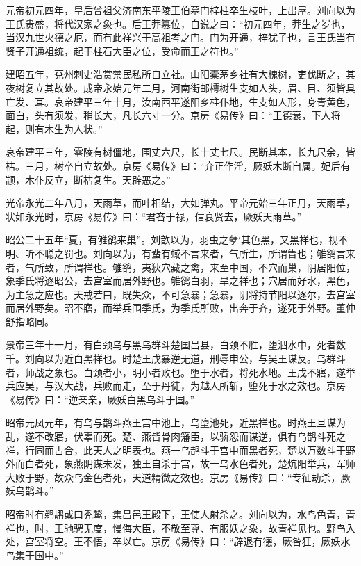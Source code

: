 \documentclass[12pt,UTF8]{ctexbook}
\begin{document}
元帝初元四年，皇后曾祖父济南东平陵王伯墓门梓柱卒生枝叶，上出屋。刘向以为王氏贵盛，将代汉家之象也。后王莽篡位，自说之曰：“初元四年，莽生之岁也，当汉九世火德之厄，而有此祥兴于高祖考之门。门为开通，梓犹子也，言王氏当有贤子开通祖统，起于柱石大臣之位，受命而王之符也。”



建昭五年，兗州刺史浩赏禁民私所自立社。山阳橐茅乡社有大槐树，吏伐断之，其夜树复立其故处。成帝永始元年二月，河南街邮樗树生支如人头，眉、目、须皆具亡发、耳。哀帝建平三年十月，汝南西平遂阳乡柱仆地，生支如人形，身青黄色，面白，头有须发，稍长大，凡长六寸一分。京房《易传》曰：“王德衰，下人将起，则有木生为人状。”



哀帝建平三年，零陵有树僵地，围丈六尺，长十丈七尺。民断其本，长九尺余，皆枯。三月，树卒自立故处。京房《易传》曰：“弃正作淫，厥妖木断自属。妃后有颛，木仆反立，断枯复生。天辟恶之。”



光帝永光二年八月，天雨草，而叶相结，大如弹丸。平帝元始三年正月，天雨草，状如永光时，京房《易传》曰：“君吝于禄，信衰贤去，厥妖天雨草。”



昭公二十五年“夏，有雊鹆来巢”。刘歆以为，羽虫之孽‘其色黑，又黑祥也，视不明、听不聪之罚也。刘向以为，有蜚有蜮不言来者，气所生，所谓眚也；雊鹆言来者，气所致，所谓祥也。雊鹆，夷狄穴藏之禽，来至中国，不穴而巢，阴居阳位，象季氏将逐昭公，去宫室而居外野也。雊鹆白羽，旱之祥也；穴居而好水，黑色，为主急之应也。天戒若曰，既失众，不可急暴；急暴，阴将持节阳以逐尔，去宫室而居外野矣。昭不寤，而举兵围季氏，为季氏所败，出奔于齐，遂死于外野。董仲舒指略同。



景帝三年十一月，有白颈乌与黑乌群斗楚国吕县，白颈不胜，堕泗水中，死者数千。刘向以为近白黑祥也。时楚王戊暴逆无道，刑辱申公，与吴王谋反。乌群斗者，师战之象也。白颈者小，明小者败也。堕于水者，将死水地。王戊不寤，遂举兵应吴，与汉大战，兵败而走，至于丹徒，为越人所斩，堕死于水之效也。京房《易传》曰：“逆亲亲，厥妖白黑乌斗于国。”



昭帝元凤元年，有乌与鹊斗燕王宫中池上，乌堕池死，近黑祥也。时燕王旦谋为乱，遂不改寤，伏辜而死。楚、燕皆骨肉籓臣，以骄怨而谋逆，俱有乌鹊斗死之祥，行同而占合，此天人之明表也。燕一乌鹊斗于宫中而黑者死，楚以万数斗于野外而白者死，象燕阴谋未发，独王自杀于宫，故一乌水色者死，楚炕阳举兵，军师大败于野，故众乌金色者死，天道精微之效也。京房《易传》曰：“专征劫杀，厥妖乌鹊斗。”



昭帝时有鹈鹕或曰秃鹙，集昌邑王殿下，王使人射杀之。刘向以为，水鸟色青，青祥也，时，王驰骋无度，慢侮大臣，不敬至尊、有服妖之象，故青祥见也。野鸟入处，宫室将空。王不悟，卒以亡。京房《易传》曰：“辟退有德，厥咎狂，厥妖水鸟集于国中。”
\end{document}
